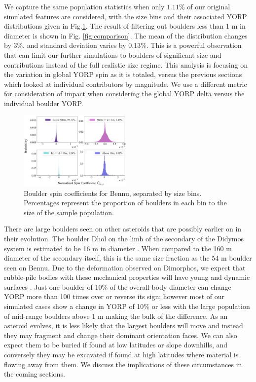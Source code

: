 We capture the same population statistics when only $1.11\%$ of our original simulated features are considered, with the size bins and their associated YORP distributions given in Fig.\ref{fig:bins}. The result of filtering out boulders less than 1 m in diameter is shown in Fig. \ref{fig:comparison}. The mean of the distribution changes by 3\%. and standard deviation varies by 0.13\%. This is a powerful observation that can limit our further simulations to boulders of significant size and contributions instead of the full realistic size regime. This analysis is focusing on the variation in global YORP spin as it is totaled, versus the previous sections which looked at individual contributors by magnitude. We use a different metric for consideration of impact when considering the global YORP delta versus the individual boulder YORP.
\begin{figure}[H]
    \centering
    \includegraphics[width=0.49\textwidth]{fig/bennu_size_binned_spreads.png}
    \caption{Boulder spin coefficients for Bennu, separated by size bins. Percentages represent the proportion of boulders in each bin to the size of the sample population.}
    \label{fig:bins}
\end{figure}
There are large boulders seen on other asteroids that are possibly earlier on in their evolution. The boulder Dhol on the limb of the secondary of the Didymos system is estimated to be 16 m in diameter \citep{Daly2024} \citep{Pajola2024}. When compared to the 160 m diameter of the secondary itself, this is the same size fraction as the 54 m boulder seen on Bennu. Due to the deformation observed on Dimorphos, we expect that rubble-pile bodies with these mechanical properties will have young and dynamic surfaces \citep{Raducan2024}. Just one boulder of 10$\%$ of the overall body diameter can change YORP more than 100 times over or reverse its sign; however most of our simulated cases show a change in YORP of 10\% or less with the large population of mid-range boulders above 1 m making the bulk of the difference. As an asteroid evolves, it is less likely that the largest boulders will move and instead they may fragment and change their dominant orientation faces. We can also expect them to be buried if found at low latitudes or slope downhills, and conversely they may be excavated if found at high latitudes where material is flowing away from them. We discuss the implications of these circumstances in the coming sections.

